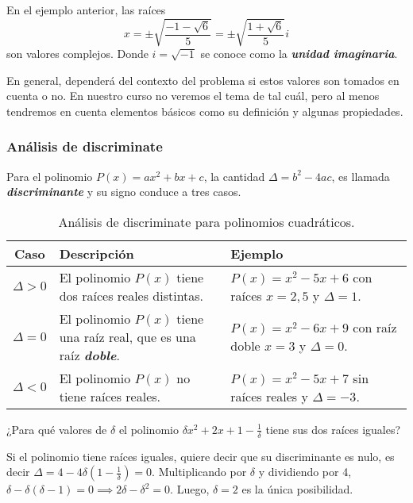 En el ejemplo anterior, las raíces
\[
    x = \pm \sqrt {\frac{-1 - \sqrt{6}}{5}} = \pm \sqrt {\frac{1 + \sqrt{6}}{5}} i
\]
son valores complejos.
Donde $i = \sqrt {-1}$ se conoce como la \textbf{\emph{unidad imaginaria}}.

En general, dependerá del contexto del problema si estos valores son tomados en cuenta o no.
En nuestro curso no veremos el tema de  tal cuál, pero al menos tendremos en cuenta elementos básicos como su definición y algunas propiedades.



\subsubsection{Análisis de discriminate}

Para el polinomio $P(x) = ax^2 + bx + c$, la cantidad $\Delta = b^2 - 4ac$, es llamada \textbf{\emph{discriminante}} y su signo conduce a tres casos.
\begin{table}[H]
    \centering
    \begin{tabular}{| c | p{6.5cm} | p{6.5cm} |}
        \hline
        Caso & Descripción & Ejemplo \\ \hline
        $\Delta > 0$ & El polinomio $P(x)$ tiene dos raíces reales distintas.&
            $P(x) = x^2 - 5x + 6$ con raíces $x = 2, 5$ y $\Delta = 1$. \\\hline
        $\Delta = 0$ & El polinomio $P(x)$ tiene una raíz real, que es una raíz \textbf{\emph{doble}}.&
            $P(x) = x^2 - 6x + 9$ con raíz doble $x = 3$ y $\Delta = 0$. \\\hline
        $\Delta < 0$ & El polinomio $P(x)$ no tiene raíces reales.&
            $P(x) = x^2 - 5x + 7$ sin raíces reales y $\Delta = -3$. \\\hline
    \end{tabular}
    \caption{Análisis de discriminate para polinomios cuadráticos.}
\end{table}

\begin{example}
    ¿Para qué valores de $\delta$ el polinomio $\delta x^2 + 2x + 1 - \frac{1}{\delta}$ tiene sus dos raíces iguales?
\end{example}
\begin{solution}
    Si el polinomio tiene raíces iguales, quiere decir que su discriminante es nulo, es decir $\Delta = 4 - 4\delta \left(1 - \frac{1}{\delta}\right) = 0$.
    Multiplicando por $\delta$ y dividiendo por 4, $ \delta - \delta (\delta - 1) = 0 \implies 2\delta - \delta^2 = 0$.
    Luego, $\delta = 2$ es la única posibilidad.
\end{solution}



